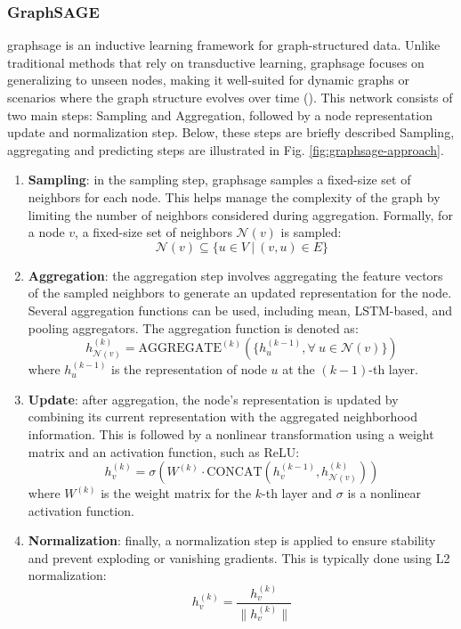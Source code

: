 \subsubsection*{GraphSAGE}

\gls{graphsage} is an inductive learning framework for graph-structured data.
Unlike traditional methods that rely on transductive learning, \gls{graphsage} focuses on generalizing to unseen nodes, making it well-suited for dynamic graphs or scenarios where the graph structure evolves over time (\cite{Hamilton2017}).
This network consists of two main steps: Sampling and Aggregation, followed by a node representation update and normalization step.
Below, these steps are briefly described
Sampling, aggregating and predicting steps are illustrated in Fig. \ref{fig:graphsage-approach}.


\begin{enumerate}
    \item \textbf{Sampling}: in the sampling step, \gls{graphsage} samples a fixed-size set of neighbors for each node. This helps manage the complexity of the graph by limiting the number of neighbors considered during aggregation. Formally, for a node \(v\), a fixed-size set of neighbors \(\mathcal{N}(v)\) is sampled:
    \[
    \mathcal{N}(v) \subseteq \{u \in V~|~(v, u) \in E\}
    \]
 
    \item \textbf{Aggregation}: the aggregation step involves aggregating the feature vectors of the sampled neighbors to generate an updated representation for the node. Several aggregation functions can be used, including mean, LSTM-based, and pooling aggregators. The aggregation function is denoted as:
    \[
    h_{\mathcal{N}(v)}^{(k)} = \text{AGGREGATE}^{(k)}(\{h_u^{(k-1)}, \forall~u \in \mathcal{N}(v)\})
    \]
    where \(h_u^{(k-1)}\) is the representation of node \(u\) at the \((k-1)\)-th layer.
 
    \item \textbf{Update}: after aggregation, the node's representation is updated by combining its current representation with the aggregated neighborhood information. This is followed by a nonlinear transformation using a weight matrix and an activation function, such as ReLU:
    \[
    h_v^{(k)} = \sigma\left(W^{(k)} \cdot \text{CONCAT}(h_v^{(k-1)}, h_{\mathcal{N}(v)}^{(k)})\right)
    \]
    where \(W^{(k)}\) is the weight matrix for the \(k\)-th layer and \(\sigma\) is a nonlinear activation function.
 
    \item \textbf{Normalization}: finally, a normalization step is applied to ensure stability and prevent exploding or vanishing gradients. This is typically done using L2 normalization:
    \[
    h_v^{(k)} = \frac{h_v^{(k)}}{\|h_v^{(k)}\|}
    \]
\end{enumerate}

